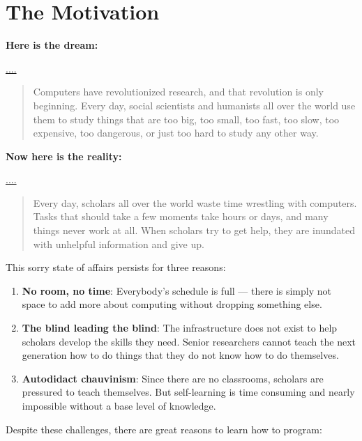 \documentclass[
]{book}
\begin{document}
\hypertarget{the-motivation}{%
\section{The Motivation}\label{the-motivation}}

\textbf{Here is the dream:}

\url{....}

\begin{quote}
Computers have revolutionized research, and that revolution is only
beginning. Every day, social scientists and humanists all over the world
use them to study things that are too big, too small, too fast, too slow,
too expensive, too dangerous, or just too hard to study any other way.
\end{quote}

\textbf{Now here is the reality:}

\url{....}

\begin{quote}
Every day, scholars all over the world waste time wrestling with
computers. Tasks that should take a few moments take hours or days,
and many things never work at all. When scholars try to get help,
they are inundated with unhelpful information and give up.
\end{quote}

This sorry state of affairs persists for three reasons:

\begin{enumerate}
\def\labelenumi{\arabic{enumi}.}
\item
  \textbf{No room, no time}: Everybody's schedule is full --- there is simply not space to add more
  about computing without dropping something else.
\item
  \textbf{The blind leading the blind}: The infrastructure does not exist to help scholars develop the skills they need. Senior researchers cannot teach the next generation how to do things
  that they do not know how to do themselves.
\item
  \textbf{Autodidact chauvinism}: Since there are no classrooms, scholars are pressured to teach themselves. But self-learning is time consuming and nearly impossible without a base level of knowledge.
\end{enumerate}

Despite these challenges, there are great reasons to learn how to program:
\end{document}

